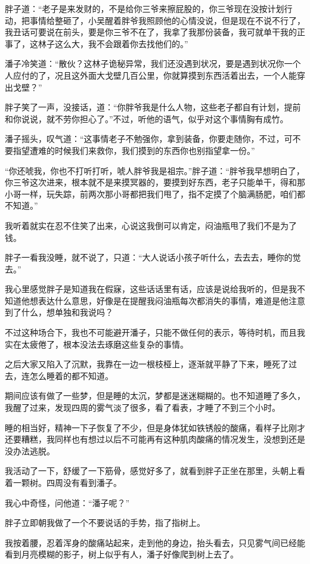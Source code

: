 胖子道：“老子是来发财的，不是给你三爷来擦屁股的，你三爷现在没按计划行动，把事情给整砸了，小吴醒着胖爷我照顾他的心情没说，但是现在不说不行了，我丑话可要说在前头，要是你三爷不在了，我拿了我那份装备，我可就单干我的正事了，这林子这么大，我不会跟着你去找他们的。”

潘子冷笑道：“散伙？这林子诡秘异常，我们还没遇到状况，要是遇到状况你一个人应付的了，况且这外面大戈壁几百公里，你就算摸到东西活着出去，一个人能穿出戈壁？”

胖子笑了一声，没接话，道：“你胖爷我是什么人物，这些老子都自有计划，提前和你说说，就不劳你担心了。”不过，听他的语气，似乎对这个事情胸有成竹。

潘子摇头，叹气道：“这事情老子不勉强你，拿到装备，你要走随你，不过，可不要指望遭难的时候我们来救你，我们摸到的东西你也别指望拿一份。”

“你还唬我，你也不打听打听，唬人胖爷我是祖宗。”胖子道：“胖爷我早想明白了，你三爷这次进来，根本就不是来摸冥器的，要摸到好东西，老子只能单干，得和那小哥一样，玩失踪，前两次那小哥都把我们甩了，指不定摸了个脑满肠肥，咱们都不知道。”

我听着就实在忍不住笑了出来，心说这我倒可以肯定，闷油瓶甩了我们不是为了钱。

胖子一看我没睡，就不说了，只道：“大人说话小孩子听什么，去去去，睡你的觉去。”

我心里感觉胖子是知道我在假寐，这些话话里有话，应该是说给我听的，但是我不知道他想表达什么意思，好像是在提醒我闷油瓶每次都消失的事情，难道是他注意到了什么，想单独和我说吗？

不过这种场合下，我也不可能避开潘子，只能不做任何的表示，等待时机，而且我实在太疲倦了，根本没法去琢磨这些复杂的事情。

之后大家又陷入了沉默，我靠在一边一根枝桠上，逐渐就平静了下来，睡死了过去，连怎么睡着的都不知道。

期间应该有做了一些梦，但是睡的太沉，梦都是迷迷糊糊的。也不知道睡了多久，我醒了过来，发现四周的雾气淡了很多，看了看表，才睡了不到三个小时。

睡的相当好，精神一下子恢复了不少，但是身体犹如铁锈般的酸痛，看样子比刚才还要糟糕，我同样也有想过以后不可能再有这种肌肉酸痛的情况发生，没想到还是没办法逃脱。

我活动了一下，舒缓了一下筋骨，感觉好多了，就看到胖子正坐在那里，头朝上看着一颗树。四周没有看到潘子。

我心中奇怪，问他道：“潘子呢？”

胖子立即朝我做了一个不要说话的手势，指了指树上。

我按着腰，忍着浑身的酸痛站起来，走到他的身边，抬头看去，只见雾气间已经能看到月亮模糊的影子，树上似乎有人，潘子好像爬到树上去了。

